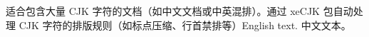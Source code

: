 \documentclass{article}
\begin{document}
适合包含大量 CJK 字符的文档（如中文文档或中英混排）。通过 xeCJK 包自动处理 CJK 字符的排版规则（如标点压缩、行首禁排等）English text. 中文文本。
\end{document}
